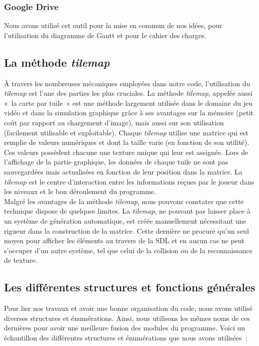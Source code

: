 \documentclass[12pt,a4paper]{article}
\begin{document}
            \subsubsection{Google Drive}
                \tabto{1cm} Nous avons utilisé cet outil pour la mise en commun de nos idées, pour l’utilisation du diagramme de Gantt et pour le cahier des charges.

        \subsection{La méthode \textit{tilemap}}
            \tabto{1cm} À travers les nombreuses mécaniques employées dans notre code, l’utilisation du \textit{tilemap} est l’une des parties les plus cruciales. La méthode \textit{tilemap}, appelée aussi «~la carte par tuile~» est une méthode largement utilisée dans le domaine du jeu vidéo et dans la simulation graphique grâce à ses avantages sur la mémoire (petit coût par rapport au chargement d’image), mais aussi sur son utilisation (facilement utilisable et exploitable). Chaque \textit{tilemap} utilise une matrice qui est remplie de valeurs numériques et dont la taille varie (en fonction de son utilité). Ces valeurs possèdent chacune une texture unique qui leur est assignée. Lors de l’affichage de la partie graphique, les données de chaque tuile ne sont pas sauvegardées mais actualisées en fonction de leur position dans la matrice. La \textit{tilemap} est le centre d’interaction entre les informations reçues par le joueur dans les niveaux et le bon déroulement du programme.\\
	
        	\tabto{1cm} Malgré les avantages de la méthode \textit{tilemap}, nous pouvons constater que cette technique dispose de quelques limites. La \textit{tilemap}, ne pouvant pas laisser place à un système de génération automatique, est créée manuellement nécessitant une rigueur dans la construction de la matrice. Cette dernière ne procure qu’un seul moyen pour afficher les éléments au travers de la SDL et en aucun cas ne peut s’occuper d’un autre système, tel que celui de la collision ou de la reconnaissance de texture.

         \subsection{Les différentes structures et fonctions générales}
            \tabto{1cm} Pour lier nos travaux et avoir une bonne organisation du code, nous avons utilisé diverses structures et énumérations. Ainsi, nous utilisons les mêmes noms de ces dernières pour avoir une meilleure fusion des modules du programme. Voici un échantillon des différentes structures et énumérations que nous avons utilisées~:\\
\end{document}
